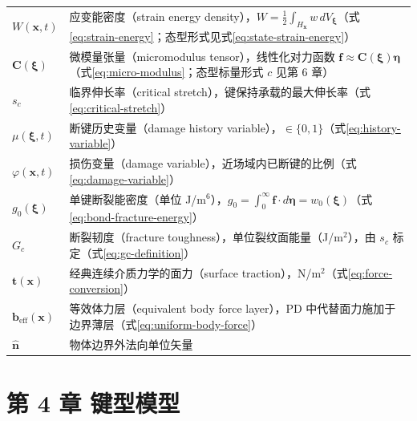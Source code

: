 {\begin{tabular}{@{}p{}@{}p{}@{}}
  $W(\mathbf{x},t)$ & 应变能密度（strain energy density），$W=\tfrac{1}{2}\int_{H_{\mathbf{x}}} w\, dV_{\boldsymbol{\xi}}$（式\eqref{eq:strain-energy}；态型形式见式\eqref{eq:state-strain-energy}） \\
  $\mathbf{C}(\boldsymbol{\xi})$ & 微模量张量（micromodulus tensor），线性化对力函数 $\mathbf{f}\approx\mathbf{C}(\boldsymbol{\xi})\boldsymbol{\eta}$（式\eqref{eq:micro-modulus}；态型标量形式 $c$ 见第 6 章） \\
  $s_c$ & 临界伸长率（critical stretch），键保持承载的最大伸长率（式\eqref{eq:critical-stretch}） \\
  $\mu(\boldsymbol{\xi},t)$ & 断键历史变量（damage history variable），$\in\{0,1\}$（式\eqref{eq:history-variable}） \\
  $\varphi(\mathbf{x},t)$ & 损伤变量（damage variable），近场域内已断键的比例（式\eqref{eq:damage-variable}） \\
  $g_0(\boldsymbol{\xi})$ & 单键断裂能密度（单位 J/m$^6$），$g_0=\int_0^{\infty}\mathbf{f}\cdot d\boldsymbol{\eta}=w_0(\boldsymbol{\xi})$（式\eqref{eq:bond-fracture-energy}） \\
  $G_c$ & 断裂韧度（fracture toughness），单位裂纹面能量（J/m$^2$），由 $s_c$ 标定（式\eqref{eq:gc-definition}） \\
  $\mathbf{t}(\mathbf{x})$ & 经典连续介质力学的面力（surface traction），N/m$^2$（式\eqref{eq:force-conversion}） \\
  $\mathbf{b}_{\text{eff}}(\mathbf{x})$ & 等效体力层（equivalent body force layer），PD 中代替面力施加于边界薄层（式\eqref{eq:uniform-body-force}） \\
  $\hat{\mathbf{n}}$ & 物体边界外法向单位矢量 \\
\end{tabular}
}

\section*{第 4 章 键型模型}

